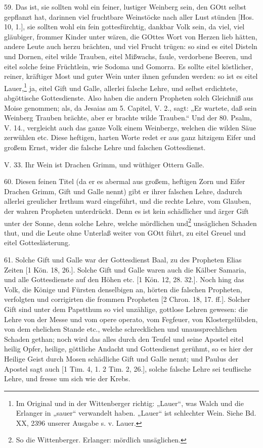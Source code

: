 59. Das ist, sie sollten wohl ein feiner, lustiger Weinberg sein, den GOtt selbst gepflanzt hat, darinnen viel fruchtbare Weinstöcke nach aller Lust stünden [Hos. 10, 1.], sie sollten wohl ein fein gottesfürchtig, dankbar Volk sein, da viel, viel gläubiger, frommer Kinder unter wären, die GOttes Wort von Herzen lieb hätten, andere Leute auch herzu brächten, und viel Frucht trügen: so sind es eitel Disteln und Dornen, eitel wilde Trauben, eitel Mißwachs, faule, verdorbene Beeren, und eitel solche feine Früchtlein, wie Sodoma und Gomorra. Es sollte eitel köstlicher, reiner, kräftiger Most und guter Wein unter ihnen gefunden werden: so ist es eitel Lauer,\footnote{Im Original und in der Wittenberger richtig: „Lauer“, was Walch und die Erlanger in „sauer“ verwandelt haben. „Lauer“ ist schlechter Wein. Siehe Bd. XX, 2396 unserer Ausgabe s. v. Lauer.} ja, eitel Gift und Galle, allerlei falsche Lehre, und selbst erdichtete, abgöttische Gottesdienste. Also haben die andern Propheten solch Gleichniß aus Moise genommen; als, da Jesaias am 5. Capitel, V. 2., sagt: „Er wartete, daß sein Weinberg Trauben brächte, aber er brachte wilde Trauben.“ Und der 80. Psalm, V. 14., vergleicht auch das ganze Volk einem Weinberge, welchen die wilden Säue zerwühlen etc. Diese heftigen, harten Worte redet er aus ganz hitzigem Eifer und großem Ernst, wider die falsche Lehre und falschen Gottesdienst.

\begin{schriftzitat}
V. 33. Ihr Wein ist Drachen Grimm, und wüthiger Ottern Galle.
\end{schriftzitat}

60. Diesen feinen Titel (da er es abermal aus großem, heftigen Zorn und Eifer Drachen Grimm, Gift und Galle nennt) gibt er ihrer falschen Lehre, dadurch allerlei greulicher Irrthum ward eingeführt, und die rechte Lehre, vom Glauben, der wahren Propheten unterdrückt. Denn es ist kein schädlicher und ärger Gift unter der Sonne, denn solche Lehre, welche mördlichen und\footnote{So die Wittenberger. Erlanger: mördlich unsäglichen.} unsäglichen Schaden thut, und die Leute ohne Unterlaß weiter von GOtt führt, zu eitel Greuel und eitel Gotteslästerung.

61. Solche Gift und Galle war der Gottesdienst Baal, zu des Propheten Elias Zeiten [1 Kön. 18, 26.]. Solche Gift und Galle waren auch die Kälber Samaria, und alle Gottesdienste auf den Höhen etc. [1 Kön. 12, 28. 32.]. Noch hing das Volk, die Könige und Fürsten denselbigen
an, hörten die falschen Propheten, verfolgten und corrigirten die frommen Propheten [2 Chron. 18, 17. ff.]. Solcher Gift sind unter dem Papstthum so viel unzählige, gottlose Lehren gewesen: die Lehre von der Messe und vom opere operato, vom Fegfeuer, von Klostergelübden, von dem ehelichen Stande etc., welche schrecklichen und unaussprechlichen Schaden gethan; noch wird das alles durch den Teufel und seine Apostel eitel heilig Opfer, heilige, göttliche Andacht und Gottesdienst gerühmt, so es hier der Heilige Geist durch Mosen schädliche Gift und Galle nennt; und Paulus der Apostel sagt auch [1 Tim. 4, 1. 2 Tim. 2, 26.], solche falsche Lehre sei teuflische Lehre, und fresse um sich wie der Krebs.

